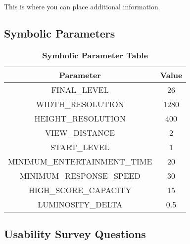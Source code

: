 \documentclass[12pt, titlepage]{article}
\begin{document}
	This is where you can place additional information.

	\subsection{Symbolic Parameters}

		\begin{table}[h!]
			\centering
			\caption{\textbf{Symbolic Parameter Table}}
			\label{symbolicParameters}
			\bigskip
			\def\arraystretch{1.6}


			\begin{tabular}{| c | c |}
				\bottomrule
				\textbf{Parameter} & \textbf{Value} \\
				\hline
				FINAL\_LEVEL & 26 \\
				WIDTH\_RESOLUTION & 1280 \\
				HEIGHT\_RESOLUTION & 400 \\
				VIEW\_DISTANCE & 2 \\
				START\_LEVEL & 1 \\
				MINIMUM\_ENTERTAINMENT\_TIME & 20 \\
				MINIMUM\_RESPONSE\_SPEED & 30 \\
				HIGH\_SCORE\_CAPACITY & 15 \\
				LUMINOSITY\_DELTA & 0.5 \\
				\toprule
			\end{tabular}
		\end{table}

\newpage
\subsection{Usability Survey Questions}
\end{document}

